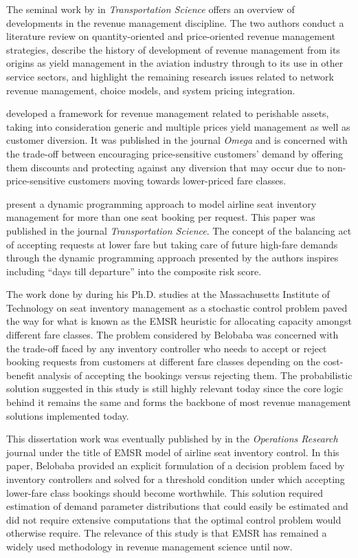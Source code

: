 The seminal work by \citet{McGillVanRyzin1999} in \textit{Transportation Science} offers an overview of developments in the revenue management discipline. The two authors conduct a literature review on quantity-oriented and price-oriented revenue management strategies, describe the history of development of revenue management from its origins as yield management in the aviation industry through to its use in other service sectors, and highlight the remaining research issues related to network revenue management, choice models, and system pricing integration.

\citet{BodilyWeatherford1995} developed a framework for revenue management related to perishable assets, taking into consideration generic and multiple prices yield management as well as customer diversion. It was published in the journal \textit{Omega} and is concerned with the trade-off between encouraging price-sensitive customers' demand by offering them discounts and protecting against any diversion that may occur due to non-price-sensitive customers moving towards lower-priced fare classes.

\citet{LeeHersh1993} present a dynamic programming approach to model airline seat inventory management for more than one seat booking per request. This paper was published in the journal \textit{Transportation Science}. The concept of the balancing act of accepting requests at lower fare but taking care of future high-fare demands through the dynamic programming approach presented by the authors inspires including ``days till departure'' into the composite risk score.

The work done by \citet{Belobaba1987} during his Ph.D. studies at the Massachusetts Institute of Technology on seat inventory management as a stochastic control problem paved the way for what is known as the EMSR heuristic for allocating capacity amongst different fare classes. The problem considered by Belobaba was concerned with the trade-off faced by any inventory controller who needs to accept or reject booking requests from customers at different fare classes depending on the cost-benefit analysis of accepting the bookings versus rejecting them. The probabilistic solution suggested in this study is still highly relevant today since the core logic behind it remains the same and forms the backbone of most revenue management solutions implemented today.

This dissertation work was eventually published by \citet{Belobaba1989} in the \textit{Operations Research} journal under the title of EMSR model of airline seat inventory control. In this paper, Belobaba provided an explicit formulation of a decision problem faced by inventory controllers and solved for a threshold condition under which accepting lower-fare class bookings should become worthwhile. This solution required estimation of demand parameter distributions that could easily be estimated and did not require extensive computations that the optimal control problem would otherwise require. The relevance of this study is that EMSR has remained a widely used methodology in revenue management science until now.

